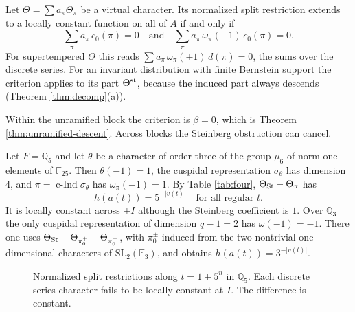 \begin{corollary}\label{cor:descent}Let $\Theta=\sum a_\pi\Theta_\pi$ be a virtual character. Its normalized split restriction extends to a locally constant function on all of $A$ if and only if
\[
\sum_\pi a_\pi\,c_0(\pi)=0\quad\text{and}\quad\sum_\pi a_\pi\,\omega_\pi(-1)\,c_0(\pi)=0 .
\]
For supertempered $\Theta$ this reads $\sum a_\pi\,\omega_\pi(\pm1)\,d(\pi)=0$, the sums over the discrete series. For an invariant distribution with finite Bernstein support the criterion applies to its part $\Theta^{\rm st}$, because the induced part always descends (Theorem \ref{thm:decomp}(a)).
\end{corollary}
Within the unramified block the criterion is $\beta=0$, which is Theorem \ref{thm:unramified-descent}. Across blocks the Steinberg obstruction can cancel.
\begin{example}\label{ex:cancel}
Let $F=\mathbb Q_5$ and let $\theta$ be a character of order three of the group $\mu_6$ of norm-one elements of $\mathbb F_{25}$. Then $\theta(-1)=1$, the cuspidal representation $\sigma_\theta$ has dimension $4$, and $\pi=\operatorname{c-Ind}\sigma_\theta$ has $\omega_\pi(-1)=1$. By Table \ref{tab:four}, $\Theta_{\operatorname{St}}-\Theta_\pi$ has
\[
h(a(t))=5^{-|v(t)|}\quad\text{for all regular }t .
\]
It is locally constant across $\pm I$ although the Steinberg coefficient is $1$. Over $\mathbb Q_3$ the only cuspidal representation of dimension $q-1=2$ has $\omega(-1)=-1$. There one uses $\Theta_{\operatorname{St}}-\Theta_{\pi_0^+}-\Theta_{\pi_0^-}$, with $\pi_0^\pm$ induced from the two nontrivial one-dimensional characters of $\mathrm{SL}_2(\mathbb F_3)$, and obtains $h(a(t))=3^{-|v(t)|}$.
\end{example}
\begin{figure}[htbp]\centering
{}
\caption{Normalized split restrictions along $t=1+5^n$ in $\mathbb Q_5$. Each discrete series character fails to be locally constant at $I$. The difference is constant.}\label{fig:cancel}
\end{figure}

